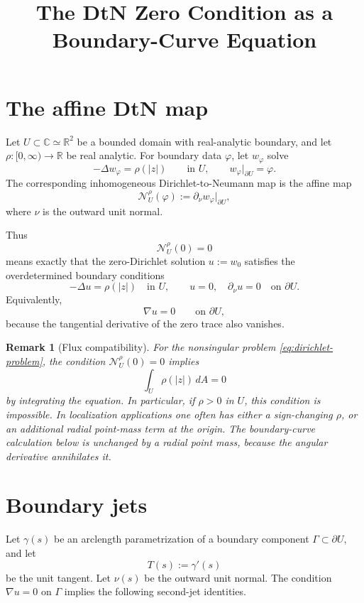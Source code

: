 \documentclass[11pt]{article}
\title{The DtN Zero Condition as a Boundary-Curve Equation}
\author{}
\date{}
\newtheorem{remark}[theorem]{Remark}
\newcommand{\C}{\mathbb C}
\newcommand{\R}{\mathbb R}
\newcommand{\dd}{\,d}
\newcommand{\1}{\mathbf 1}
\begin{document}
\maketitle

\section{The affine DtN map}

Let \(U\subset\C\simeq\R^2\) be a bounded domain with real-analytic boundary, and
let \(\rho:[0,\infty)\to\R\) be real analytic.  For boundary data
\(\varphi\), let \(w_\varphi\) solve
\begin{equation}\label{eq:dirichlet-problem}
  -\Delta w_\varphi=\rho(|z|)
  \qquad\text{in }U,\qquad
  w_\varphi|_{\partial U}=\varphi .
\end{equation}
The corresponding inhomogeneous Dirichlet-to-Neumann map is the affine map
\[
  \mathcal N_U^\rho(\varphi):=\partial_\nu w_\varphi|_{\partial U},
\]
where \(\nu\) is the outward unit normal.

Thus
\[
  \mathcal N_U^\rho(0)=0
\]
means exactly that the zero-Dirichlet solution \(u:=w_0\) satisfies the
overdetermined boundary conditions
\begin{equation}\label{eq:overdetermined}
  -\Delta u=\rho(|z|)\quad\text{in }U,\qquad
  u=0,\quad \partial_\nu u=0\quad\text{on }\partial U .
\end{equation}
Equivalently,
\[
  \nabla u=0\qquad\text{on }\partial U,
\]
because the tangential derivative of the zero trace also vanishes.

\begin{remark}[Flux compatibility]
For the nonsingular problem \eqref{eq:dirichlet-problem}, the condition
\(\mathcal N_U^\rho(0)=0\) implies
\[
  \int_U \rho(|z|)\dd A=0
\]
by integrating the equation.  In particular, if \(\rho>0\) in \(U\), this
condition is impossible.  In localization applications one often has either a
sign-changing \(\rho\), or an additional radial point-mass term at the origin.
The boundary-curve calculation below is unchanged by a radial point mass,
because the angular derivative annihilates it.
\end{remark}

\section{Boundary jets}

Let \(\gamma(s)\) be an arclength parametrization of a boundary component
\(\Gamma\subset\partial U\), and let
\[
  T(s):=\gamma'(s)
\]
be the unit tangent.  Let \(\nu(s)\) be the outward unit normal.  The condition
\(\nabla u=0\) on \(\Gamma\) implies the following second-jet identities.
\end{document}
